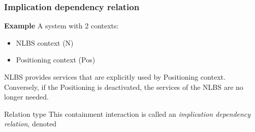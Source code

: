 \begin{frame}[noframenumbering]
	\frametitle{Implication dependency relation}

	\textbf{Example} A system with 2 contexts:

	\begin{itemize}
		\item NLBS context (N)
		\item Positioning context (Pos)
	\end{itemize}

	NLBS provides services that are explicitly used by Positioning context.
	Conversely, if the Positioning is deactivated, the services of the NLBS
	are no longer needed.

	\begin{exampleblock}{Relation type}
		This containment interaction is called an \textit{implication
		dependency relation}, denoted 
	\end{exampleblock}
\end{frame}
